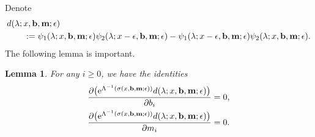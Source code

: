 \documentclass[11pt]{article}
\numberwithin{equation}{section}
\newcommand{\e}{\epsilon}
\newcommand{\p}{\partial}
\numberwithin{equation}{section}
\newtheorem{Lemma}[Theorem]{Lemma}
\begin{document}
Denote
\begin{align*}
&d(\lambda; x, {\bf b}, {\bf m};\e) \\
&\qquad{}:= \psi_1(\lambda; x, {\bf b}, {\bf m};\e) \psi_2(\lambda; x-\e, {\bf b}, {\bf m};\e)
- \psi_1(\lambda; x-\e, {\bf b}, {\bf m};\e) \psi_2(\lambda; x, {\bf b}, {\bf m};\e).
\end{align*}
The following lemma is important.
\begin{Lemma}\label{keylemma}
For any $i\ge0$, we have the identities
\begin{align}
& \frac{\p \bigl({\rm e}^{\Lambda^{-1}(\sigma(x,{\bf b},{\bf m};\e))}d(\lambda; x, {\bf b}, {\bf m};\e)\bigr)}{\p b_i} =0 , \label{id1} \\
& \frac{\p \bigl({\rm e}^{\Lambda^{-1}(\sigma(x,{\bf b},{\bf m};\e))}d(\lambda; x, {\bf b}, {\bf m};\e)\bigr)}{\p m_i} =0. \label{id2}
\end{align}
\end{Lemma}
\end{document}
